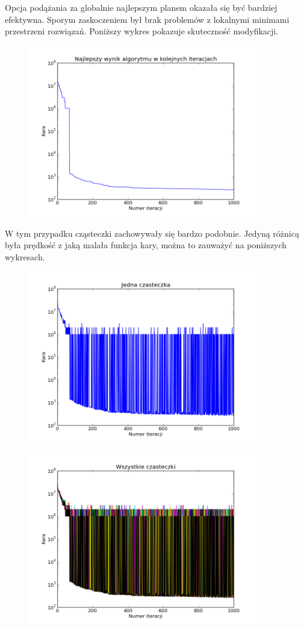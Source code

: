 \par Opcja podążania za globalnie najlepszym planem okazała się być bardziej efektywna. Sporym zaskoczeniem był brak problemów z lokalnymi minimami przestrzeni rozwiązań. Poniższy wykres pokazuje skuteczność modyfikacji.
\begin{figure}[H]
\includegraphics[width=10cm]{img/globalbest_penalty.png}
\centering
\end{figure}
\par W tym przypadku cząsteczki zachowywały się bardzo podobnie. Jedyną różnicą była prędkość z jaką malała funkcja kary, można to zauważyć na poniższych wykresach. 

\begin{figure}[H]
\includegraphics[width=10cm]{img/globalbest_particle.png}
\centering
\end{figure}

\begin{figure}[H]
\includegraphics[width=10cm]{img/globalbest_particle_all.png}
\centering
\end{figure}

